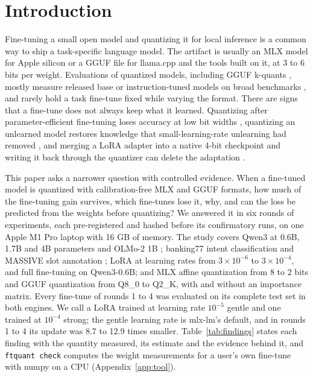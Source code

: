 \documentclass[10pt]{article}
\begin{document}
\section{Introduction}
\label{sec:intro}

Fine-tuning a small open model and quantizing it for local inference is a common way to ship a task-specific language model. The artifact is usually an MLX model for Apple silicon \citep{mlx2023} or a GGUF file for llama.cpp \citep{llamacpp} and the tools built on it, at 3 to 6 bits per weight. Evaluations of quantized models, including GGUF k-quants \citep{kurt2026llamacpp}, mostly measure released base or instruction-tuned models on broad benchmarks \citep{kurtic2025bf16,kurt2026llamacpp}, and rarely hold a task fine-tune fixed while varying the format. There are signs that a fine-tune does not always keep what it learned. Quantizing after parameter-efficient fine-tuning loses accuracy at low bit widths \citep{xu2023qalora}, quantizing an unlearned model restores knowledge that small-learning-rate unlearning had removed \citep{zhang2025unlearning}, and merging a LoRA adapter into a native 4-bit checkpoint and writing it back through the quantizer can delete the adaptation \citep{li2026scaleqlora}.

This paper asks a narrower question with controlled evidence. When a fine-tuned model is quantized with calibration-free MLX and GGUF formats, how much of the fine-tuning gain survives, which fine-tunes lose it, why, and can the loss be predicted from the weights before quantizing? We answered it in six rounds of experiments, each pre-registered and hashed before its confirmatory runs, on one Apple M1 Pro laptop with 16 GB of memory. The study covers Qwen3 at 0.6B, 1.7B and 4B parameters \citep{qwen3} and OLMo-2 1B \citep{olmo2}; banking77 intent classification \citep{casanueva2020banking77} and MASSIVE slot annotation \citep{fitzgerald2023massive}; LoRA \citep{hu2022lora} at learning rates from $3\times10^{-6}$ to $3\times10^{-4}$, and full fine-tuning on Qwen3-0.6B; and MLX affine quantization from 8 to 2 bits and GGUF quantization from Q8\_0 to Q2\_K, with and without an importance matrix. Every fine-tune of rounds 1 to 4 was evaluated on its complete test set in both engines. We call a LoRA trained at learning rate $10^{-5}$ gentle and one trained at $10^{-4}$ strong; the gentle learning rate is mlx-lm's default, and in rounds 1 to 4 its update was 8.7 to 12.9 times smaller. Table~\ref{tab:findings} states each finding with the quantity measured, its estimate and the evidence behind it, and \texttt{ftquant check} computes the weight measurements for a user's own fine-tune with numpy on a CPU (Appendix~\ref{app:tool}).
\end{document}
